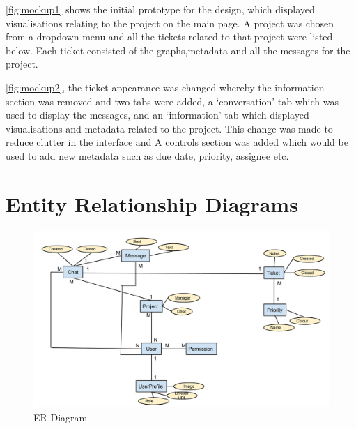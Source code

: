 \documentclass[a4paper]{l3proj}
\begin{document}
\autoref{fig:mockup1} shows the initial prototype for the design, which displayed visualisations relating to the project on the main page.  A project was chosen from a dropdown menu and all the tickets related to that project were listed below.  Each ticket consisted of the graphs,metadata and all the messages for the project.

\autoref{fig:mockup2}, the ticket appearance was changed whereby the information section was removed and two tabs were added, a ‘conversation’ tab which was used to display the messages, and an ‘information’ tab which displayed visualisations and metadata related to the project. This change was made to reduce clutter in the interface and  A controls section was added which would be used to add new metadata such as due date, priority, assignee etc.






\section{Entity Relationship Diagrams}

\begin{figure}
\centering
\includegraphics[scale=0.4]{ER_Diagram}
\caption{ER Diagram}
\end{figure}
\end{document}
